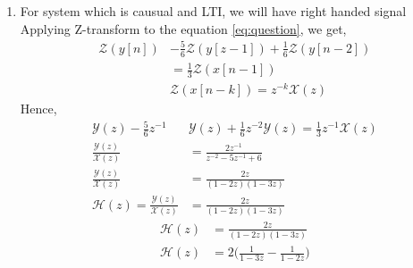\documentclass[journal,12pt,two column]{IEEEtran}
\begin{document}
\begin{enumerate}
	\item For system which is causual and LTI, we will have right handed signal
	Applying Z-transform to the equation \eqref{eq:question}, we get,
	\begin{align}
		 \mathcal{Z}(y[n])&-\frac{5}{6} \mathcal{Z}(y[z-1])+\frac{1}{6} \mathcal{Z}(y[n-2])\\ &=\frac{1}{3} \mathcal{Z}(x[n-1])\\
&\mathcal{Z}(x[n-k])=z^{-k}\mathcal{X}(z)
\end{align}		
	Hence,
	\begin{align}
		\mathcal{Y}(z)-\frac{5}{6} z^{-1}& \mathcal{Y}(z)+\frac{1}{6} z^{-2} \mathcal{Y}(z)=\frac{1}{3} z^{-1} \mathcal{X}(z)\\
		\frac{\mathcal{Y}(z)}{\mathcal{X}(z)}&=\frac{2z^{-1}}{z^{-2}-5z^{-1}+6}
		\\
		\label{eq:yx}
		\frac{\mathcal{Y}(z)}{\mathcal{X}(z)}&=\frac{2z}{(1-2z)(1-3z)}\\
		\mathcal{H}(z)=\frac{\mathcal{Y}(z)}{\mathcal{X}(z)}&=\frac{2z}{(1-2z)(1-3z)}
	\end{align}
\begin{align}
		\label{eq:hz1}
		\mathcal{H}(z)&=\frac{2z}{(1-2z)(1-3z)}
\\
\label{eq:hz}
\mathcal{H}(z)&=2\bigg(\frac{1}{1-3z}-\frac{1}{1-2z}\bigg)
	\end{align}


\end{enumerate}
\end{document}
